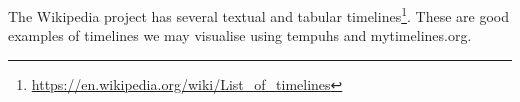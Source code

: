 The Wikipedia project has several textual and tabular 
timelines\footnote{\url{https://en.wikipedia.org/wiki/List_of_timelines}}. 
These are good examples of timelines we may visualise using tempuhs and 
mytimelines.org.
